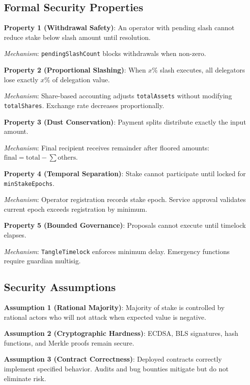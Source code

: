 \documentclass[11pt,a4paper]{article}
\begin{document}
\subsection{Formal Security Properties}

\textbf{Property 1 (Withdrawal Safety)}: An operator with pending slash cannot reduce stake below slash amount until resolution.

\textit{Mechanism}: \texttt{pendingSlashCount} blocks withdrawals when non-zero.

\textbf{Property 2 (Proportional Slashing)}: When $x$\% slash executes, all delegators lose exactly $x$\% of delegation value.

\textit{Mechanism}: Share-based accounting adjusts \texttt{totalAssets} without modifying \texttt{totalShares}. Exchange rate decreases proportionally.

\textbf{Property 3 (Dust Conservation)}: Payment splits distribute exactly the input amount.

\textit{Mechanism}: Final recipient receives remainder after floored amounts: $\text{final} = \text{total} - \sum \text{others}$.

\textbf{Property 4 (Temporal Separation)}: Stake cannot participate until locked for \texttt{minStakeEpochs}.

\textit{Mechanism}: Operator registration records stake epoch. Service approval validates current epoch exceeds registration by minimum.

\textbf{Property 5 (Bounded Governance)}: Proposals cannot execute until timelock elapses.

\textit{Mechanism}: \texttt{TangleTimelock} enforces minimum delay. Emergency functions require guardian multisig.

\subsection{Security Assumptions}

\textbf{Assumption 1 (Rational Majority)}: Majority of stake is controlled by rational actors who will not attack when expected value is negative.

\textbf{Assumption 2 (Cryptographic Hardness)}: ECDSA, BLS signatures, hash functions, and Merkle proofs remain secure.

\textbf{Assumption 3 (Contract Correctness)}: Deployed contracts correctly implement specified behavior. Audits and bug bounties mitigate but do not eliminate risk.
\end{document}
